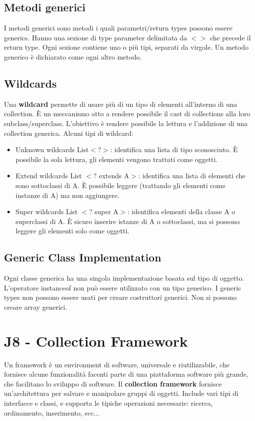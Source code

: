 \documentclass[11pt]{article}
\begin{document}
\subsection{Metodi generici}
I metodi generici sono metodi i quali parametri/return types possono essere generics. Hanno una sezione di type parameter delimitata da $<>$ che precede il return type. Ogni sezione contiene uno o più tipi, separati da virgole. Un metodo generico è dichiarato come ogni altro metodo. 
\subsection{Wildcards}
Una \textbf{wildcard} permette di usare più di un tipo di elementi all'interno di una collection. È un meccanismo atto a rendere possibile il cast di collections alla loro subclass/superclass. L'obiettivo è rendere possibile la lettura e l'addizione di una collection generica. 
Alcuni tipi di wildcard:
\begin{itemize}
    \item Unknown wildcards List$<$?$>$: identifica una lista di tipo sconosciuto. È possibile la sola lettura, gli elementi vengono trattati come oggetti.
    \item Extend wildcards List $<$? extends A$>$: identifica una lista di elementi che sono sottoclassi di A. È possibile leggere (trattando gli elementi come instanze di A) ma non aggiungere.
    \item Super wildcards List $<$? super A$>$: identifica elementi della classe A o superclassi di A. È sicuro inserire istanze di A o sottoclassi, ma si possono leggere gli elementi solo come oggetti.
\end{itemize}
\subsection{Generic Class Implementation}
Ogni classe generica ha una singola implementazione basata sul tipo di oggetto. L'operatore instanceof non può essere utilizzato con un tipo generico. I generic types non possono essere usati per creare costruttori generici. Non si possono creare array generici.
\section{J8 - Collection Framework}
Un framework è un environment di software, universale e riutilizzabile, che fornisce alcune funzionalità facenti parte di una piattaforma software più grande, che facilitano lo sviluppo di software. 
Il \textbf{collection framework} fornisce un'architettura per salvare e manipolare gruppi di oggetti. Include vari tipi di interfacce e classi, e supporta le tipiche operazioni necessarie: ricerca, ordinamento, inserimento, ecc...
\end{document}
